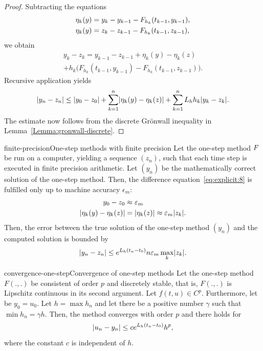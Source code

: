 

\begin{proof}
  Subtracting the equations
  \begin{align*}
    \eta_k(y) &= y_k-y_{k-1} - F_{h_k}(t_{k-1},y_{k-1}),
    \\
    \eta_k(y) &= z_k-z_{k-1} - F_{h_k}(t_{k-1},z_{k-1}),
  \end{align*}
  we obtain
  \begin{multline*}
    y_k-z_k = y_{k-1} - z_{k-1} + \eta_k(y) - \eta_k(z)
    \\
    + h_k \bigl(
      F_{h_k}(t_{k-1},y_{k-1})-F_{h_k}(t_{k-1},z_{k-1})
    \bigr)
    .
  \end{multline*}
  Recursive application yields
  \begin{gather*}
    \lvert y_n-z_n\rvert \le \lvert y_0-z_0\rvert
    + \sum_{k=1}^n \lvert\eta_k(y)-\eta_k(z)\rvert
    + \sum_{k=1}^n L_h h_{k} \lvert y_k-z_k\rvert.
  \end{gather*}
  The estimate now follows from the discrete Grönwall inequality in
  Lemma~\ref{Lemma:gronwall-discrete}.
\end{proof}

\begin{Corollary*}{finite-precision}{One-step methods with finite precision}
  Let the one-step method $F$ be run on a computer, yielding
  a sequence $(z_n)$, such that each time step is executed in finite
  precision arithmetic. Let $(y_n)$ be the mathematically correct
  solution of the one-step method. Then, the difference
  equation~\eqref{eq:explicit:8} is fulfilled only up to machine
  accuracy $\epsilon_m$:
  \begin{align*}
    y_0-z_0 &\approx \varepsilon_m \\
    \lvert\eta_k(y) - \eta_k(z)\rvert &= \lvert\eta_k(z)\rvert \approx \varepsilon_m \lvert z_k\rvert.
  \end{align*}
  Then, the error between the true solution of the one-step method
  $(y_n)$ and the computed solution is bounded by
  \begin{gather*}
    \lvert y_n-z_n\rvert \le e^{L_h(t_n-t_0)} n \varepsilon_m \max_k\lvert z_k\rvert.
  \end{gather*}
\end{Corollary*}

\begin{Theorem*}{convergence-one-step}{Convergence of one-step methods}
  Let the one-step method $F(.,.)$ be consistent of order $p$ and
  discretely stable, that is, $F(.,.)$ is Lipschitz continuous in its
  second argument. Let $f(t,u)\in C^{p}$. Furthermore, let be
  $y_0 = u_0$. Let $h = \max h_n$ and let there be a positive number
  $\gamma$ such that $\min h_n = \gamma h$. Then, the method converges
  with order $p$ and there holds for
  \begin{equation}
    \label{eq:convergence-onestep:1}
    \lvert u_n - y_n\rvert \le c e^{L_h(t_n-t_0)} h^p,
  \end{equation}
  where the constant $c$ is independent of $h$.
\end{Theorem*}

